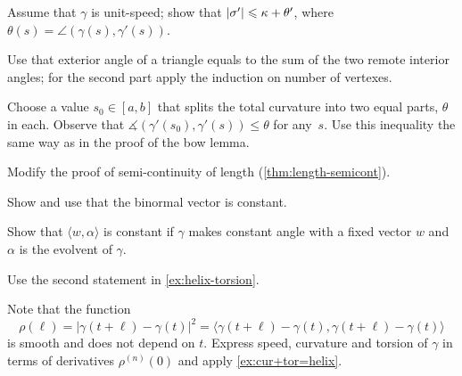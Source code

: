 


 Assume that $\gamma$ is unit-speed; show that $|\sigma'|\leqslant \kappa+\theta'$, where $\theta(s)=\angle(\gamma(s),\gamma'(s))$.


Use that exterior angle of a triangle equals to the sum of the two remote interior angles;
for the second part apply the induction on number of vertexes.




Choose a value $s_0\in[a,b]$ that splits the total curvature into two equal parts, $\theta$ in each.
Observe that $\measuredangle(\gamma'(s_0),\gamma'(s))\le \theta$ for any~$s$.
Use this inequality the same way as in the proof of the bow lemma.



 Modify the proof of semi-continuity of length (\ref{thm:length-semicont}).





Show and use that the binormal vector is constant.



Show that $\langle w,\alpha\rangle$ is constant if $\gamma$ makes constant angle with a fixed vector $w$ and $\alpha$ is the evolvent of $\gamma$.


 Use the second statement in \ref{ex:helix-torsion}.

 Note that the function
\[\rho(\ell)=|\gamma(t+\ell)-\gamma(t)|^2=\langle \gamma(t+\ell)-\gamma(t),\gamma(t+\ell)-\gamma(t)\rangle\] 
is smooth and does not depend on $t$.
Express speed, curvature and torsion of $\gamma$ in terms of derivatives $\rho^{(n)}(0)$
and apply \ref{ex:cur+tor=helix}.

